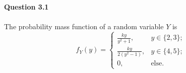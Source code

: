 \documentclass{article}
\begin{document}

%
%
{\bf Question 3.1}
~\\~\\
The probability mass function of a random variable $Y$ is
\begin{equation*}
f_Y(y)=\left\{\begin{array}{lr}
\frac{ky}{y^2+1}, & y\in \{2,3\};\\
\frac{ky}{2(y^2-1)}, & y\in\{4,5\};\\
0,& \text{else}.
\end{array}\right.
\end{equation*}
\end{document}
